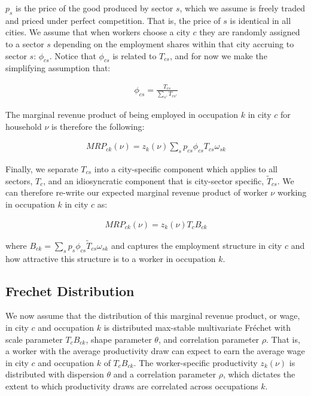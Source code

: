 \documentclass[10pt]{article}
\begin{document}
$p_{s}$ is the price of the good produced by sector $s$, which we assume is freely traded and priced under perfect competition. That is, the price of $s$ is identical in all cities. We assume that when workers choose a city $c$ they are randomly assigned to a sector $s$ depending on the employment shares within that city accruing to sector $s$: $\phi_{cs}$. Notice that $\phi_{cs}$ is related to $T_{cs}$, and for now we make the simplifying assumption that:

\begin{align}
    \phi_{cs} = \frac{T_{cs}}{\sum_{s'}^{} T_{cs'}}
\end{align}

The marginal revenue product of being employed in occupation $k$ in city $c$ for household $\nu$ is therefore the following:

\begin{align}
    {MRP}_{ck}(\nu) = {z_{k}(\nu)}\sum_{s}^{} p_{cs} \phi_{cs} T_{cs} \omega_{sk}
\end{align}

Finally, we separate $T_{cs}$ into a city-specific component which applies to all sectors, $T_{c}$, and an idiosyncratic component that is city-sector specific, $\tilde{T}_{cs}$. We can therefore re-write our expected marginal revenue product of worker $\nu$ working in occupation $k$ in city $c$ as:

\begin{align}
    {MRP}_{ck}(\nu) = {z_{k}(\nu)}{T_{c}}{B_{ck}}
\end{align}

where $B_{ck} = \sum_{s}^{} p_{s} \phi_{cs} \tilde{T}_{cs} \omega_{sk}$ and captures the employment structure in city $c$ and how attractive this structure is to a worker in occupation $k$.

\subsection{Frechet Distribution}

We now assume that the distribution of this marginal revenue product, or wage, in city $c$ and occupation $k$ is distributed max-stable multivariate Fréchet with scale parameter $T_{c}B_{ck}$, shape parameter $\theta$, and correlation parameter $\rho$. That is, a worker with the average productivity draw can expect to earn the average wage in city $c$ and occupation $k$ of $T_{c}B_{ck}$. The worker-specific productivity $z_{k}(\nu)$ is distributed with dispersion $\theta$ and a correlation parameter $\rho$, which dictates the extent to which productivity draws are correlated across occupations $k$.
\end{document}
